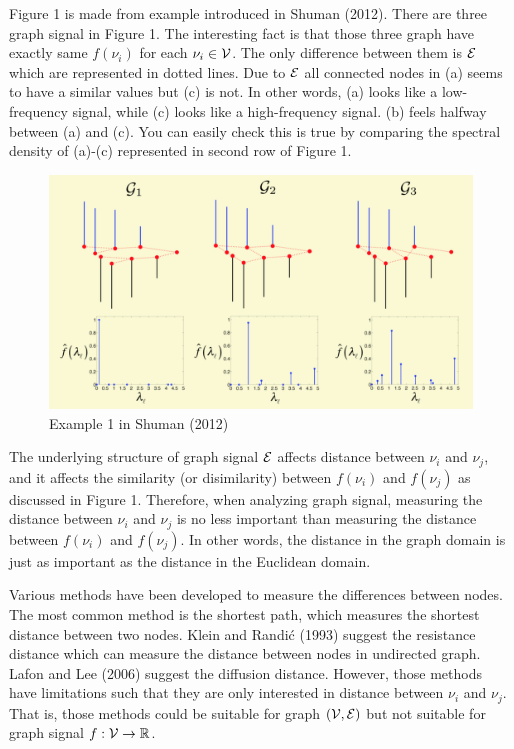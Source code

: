 \documentclass[preprint, review, 12pt]{article}
\theoremstyle{definition}
\theoremstyle{remark}
\begin{document}
Figure 1 is made from example introduced in Shuman (2012). There are three graph signal in Figure 1. The interesting fact is that those three graph have exactly same $f(\nu_i)$ for each $\nu_i \in {\cal V}$. The only difference between them is ${\cal E}$ which are represented in dotted lines. Due to ${\cal E}$ all connected nodes in (a) seems to have a similar values but (c) is not. In other words, (a) looks like a low-frequency signal, while (c) looks like a high-frequency signal. (b) feels halfway between (a) and (c). You can easily check this is true by comparing the spectral density of (a)-(c) represented in second row of Figure 1. 

\begin{figure}[htbp]
\centering
\includegraphics[width=1\textwidth]{Fig/Fig1.png} 
\caption{Example 1 in Shuman (2012)}
\end{figure}

The underlying structure of graph signal ${\cal E}$ affects distance between $\nu_i$ and $\nu_j$, and it affects the similarity (or disimilarity) between $f(\nu_i)$ and $f(\nu_j)$ as discussed in Figure 1. Therefore, when analyzing graph signal, measuring the distance between $\nu_i$ and $\nu_j$ is no less important than measuring the distance between $f(\nu_i)$ and $f(\nu_j)$. In other words, the distance in the graph domain is just as important as the distance in the Euclidean domain.

Various methods have been developed to measure the differences between nodes. The most common method is the shortest path, which measures the shortest distance between two nodes. Klein and Randić (1993) suggest the resistance distance which can measure the distance between nodes in undirected graph. Lafon and Lee (2006) suggest the diffusion distance. However, those methods have limitations such that they are only interested in distance between $\nu_i$ and $\nu_j$. That is, those methods could be suitable for graph $({\cal V},{\cal E})$ but not suitable for graph signal $f:{\cal V} \to \mathbb{R}$. 
\end{document}
